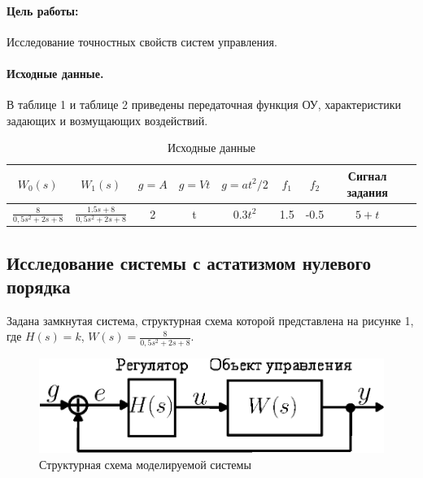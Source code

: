 \documentclass[12pt,a4paper]{article}
\begin{document}


\paragraph{Цель работы:}Исследование точностных свойств систем управления.%
\paragraph{Исходные данные.} В таблице 1 и таблице 2 приведены передаточная функция ОУ, характеристики задающих и возмущающих воздействий.
\begin{table}[h!]
	\caption{Исходные данные}
	\renewcommand{\arraystretch}{1.8} %
	\begin{tabular}{|c|c|c|c|c|c|c|c|c|}
		\hline $W_0(s)$ & $W_1(s)$ & $g = A$ & $g = Vt$ & $g = at^2/2$ &  $f_1$ & $f_2$ & Сигнал задания\\
		\hline $\displaystyle{\frac{8}{0,5s^2+2s + 8}}$& $\displaystyle{\frac{1.5s+8}{0,5s^2+2s+8}}$ & 2 & t & $0.3t^2$ & 1.5 & -0.5 & $5+t$\\
		\hline
	\end{tabular}	
\end{table}

\newpage
\begin{center}
\section{Исследование системы с астатизмом нулевого порядка}
\end{center}
\par Задана замкнутая система, структурная схема которой представлена на рисунке 1, где $H(s) = k$, $W(s)=\displaystyle{\frac{8}{0,5s^2+2s + 8}}$.
\begin{figure}[h!]
	\centering
	\includegraphics[width=0.6\linewidth]{scheme/scheme0.eps}
	\caption{Структурная схема моделируемой системы}
\end{figure}
\end{document}
